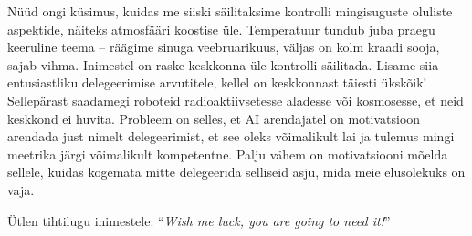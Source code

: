 Nüüd ongi küsimus, kuidas me siiski 
säilitaksime kontrolli mingisuguste oluliste aspektide, näiteks atmosfääri 
koostise üle. Temperatuur tundub juba praegu keeruline teema -- 
räägime sinuga veebruarikuus, väljas on kolm kraadi sooja, sajab vihma. 
Inimestel on raske keskkonna üle kontrolli säilitada. Lisame siia entusiastliku 
delegeerimise arvutitele, kellel on keskkonnast täiesti ükskõik! Sellepärast 
saadamegi roboteid radioaktiivsetesse aladesse või kosmosesse, et neid keskkond 
ei huvita. Probleem on selles, et AI arendajatel on motivatsioon arendada just 
nimelt delegeerimist, et see oleks võimalikult lai ja tulemus 
mingi meetrika järgi võimalikult kompetentne. Palju vähem on 
motivatsiooni mõelda sellele, kuidas kogemata mitte 
delegeerida selliseid asju, mida meie elusolekuks on vaja.


Ütlen tihtilugu inimestele: \enquote{\emph{Wish me luck, you are going to need 
it!}}